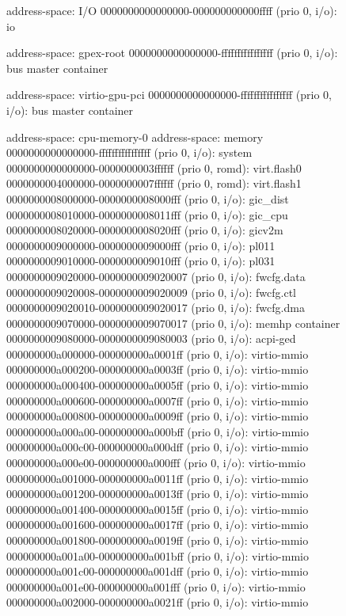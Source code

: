 \begin{figure} [ht]
  \centering
  \begin{ffcode}
    address-space: I/O
      0000000000000000-000000000000ffff (prio 0, i/o): io

    address-space: gpex-root
      0000000000000000-ffffffffffffffff (prio 0, i/o): bus master container

    address-space: virtio-gpu-pci
      0000000000000000-ffffffffffffffff (prio 0, i/o): bus master container

    address-space: cpu-memory-0
    address-space: memory
      0000000000000000-ffffffffffffffff (prio 0, i/o): system
        0000000000000000-0000000003ffffff (prio 0, romd): virt.flash0
        0000000004000000-0000000007ffffff (prio 0, romd): virt.flash1
        0000000008000000-0000000008000fff (prio 0, i/o): gic_dist
        0000000008010000-0000000008011fff (prio 0, i/o): gic_cpu
        0000000008020000-0000000008020fff (prio 0, i/o): gicv2m
        0000000009000000-0000000009000fff (prio 0, i/o): pl011
        0000000009010000-0000000009010fff (prio 0, i/o): pl031
        0000000009020000-0000000009020007 (prio 0, i/o): fwcfg.data
        0000000009020008-0000000009020009 (prio 0, i/o): fwcfg.ctl
        0000000009020010-0000000009020017 (prio 0, i/o): fwcfg.dma
        0000000009070000-0000000009070017 (prio 0, i/o): memhp container
        0000000009080000-0000000009080003 (prio 0, i/o): acpi-ged
        000000000a000000-000000000a0001ff (prio 0, i/o): virtio-mmio
        000000000a000200-000000000a0003ff (prio 0, i/o): virtio-mmio
        000000000a000400-000000000a0005ff (prio 0, i/o): virtio-mmio
        000000000a000600-000000000a0007ff (prio 0, i/o): virtio-mmio
        000000000a000800-000000000a0009ff (prio 0, i/o): virtio-mmio
        000000000a000a00-000000000a000bff (prio 0, i/o): virtio-mmio
        000000000a000c00-000000000a000dff (prio 0, i/o): virtio-mmio
        000000000a000e00-000000000a000fff (prio 0, i/o): virtio-mmio
        000000000a001000-000000000a0011ff (prio 0, i/o): virtio-mmio
        000000000a001200-000000000a0013ff (prio 0, i/o): virtio-mmio
        000000000a001400-000000000a0015ff (prio 0, i/o): virtio-mmio
        000000000a001600-000000000a0017ff (prio 0, i/o): virtio-mmio
        000000000a001800-000000000a0019ff (prio 0, i/o): virtio-mmio
        000000000a001a00-000000000a001bff (prio 0, i/o): virtio-mmio
        000000000a001c00-000000000a001dff (prio 0, i/o): virtio-mmio
        000000000a001e00-000000000a001fff (prio 0, i/o): virtio-mmio
        000000000a002000-000000000a0021ff (prio 0, i/o): virtio-mmio

\end{ffcode}
\end{figure}
